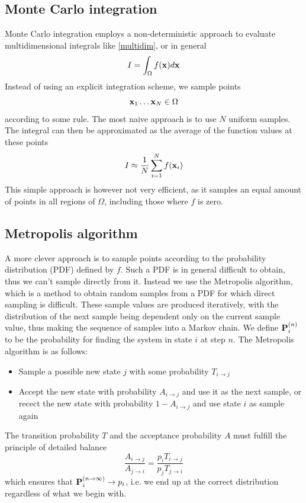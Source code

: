\documentclass[english, a4paper]{article}
\begin{document}
\subsection{Monte Carlo integration}

Monte Carlo integration employs a non-deterministic approach to evaluate multidimensional integrals like \eqref{multidim}, or
in general
\begin{equation}
 I = \int_\Omega f({\bf x}) d{\bf x}
\end{equation}
Instead of using an explicit integration scheme, we sample points
\begin{equation}
 {\bf x}_1 \dots {\bf x}_N \in \Omega
\end{equation}
according to some rule. The most naive approach is to use $N$ uniform samples. 
The integral can then be approximated as the average of the function values at these points
\begin{equation}
 I \approx \frac{1}{N} \sum_{i=1}^N f({\bf x}_i)
\end{equation}
This simple approach is however not very efficient, as it samples an equal amount of points in all regions of $\Omega$, 
including those where $f$ is zero. 

\subsection{Metropolis algorithm}

A more clever approach is to sample points according to the probability distribution (PDF)
defined by $f$. Such a PDF is in general difficult to obtain, thus we can't sample directly from it.
Instead we use the Metropolis algorithm, which is a method to obtain random samples from a PDF for which 
direct sampling is difficult. 
These sample values are produced iteratively, with the distribution of the next sample being dependent only on 
the current sample value, thus making the sequence of samples into a Markov chain.
We define ${\bf P}_i^{(n)}$ to be the 
probability for finding the system in state $i$ at step $n$. 
The Metropolis algorithm is as follows:
\begin{itemize}
 \item Sample a possible new state $j$ with some probability $T_{i\rightarrow j}$
 \item Accept the new state with probability $A_{i\rightarrow j}$ and use it as the next sample, or
 recect the new state with probability $1 - A_{i\rightarrow j}$ and use state $i$ as sample again
\end{itemize}
The transition probability $T$ and the acceptance probability $A$ must fulfill the principle of detailed balance
\begin{equation}
 \frac{A_{i\rightarrow j}}{A_{j\rightarrow i}} = \frac{p_i T_{i\rightarrow j}}{p_j T_{j\rightarrow i}}
 \label{detailedbalance}
\end{equation}
which ensures that ${\bf P}_i^{(n\rightarrow \infty)} \rightarrow p_i$, i.e. we end up at the correct 
distribution regardless of what we begin with. \\
\end{document}
